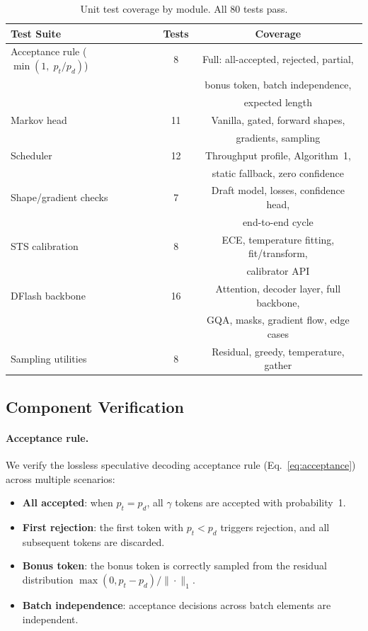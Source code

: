 \documentclass[11pt,a4paper]{article}
\begin{document}
\begin{table}[t]
\centering
\caption{Unit test coverage by module. All 80 tests pass.}
\label{tab:tests}
\begin{tabular}{lcc}
\toprule
Test Suite & Tests & Coverage \\
\midrule
Acceptance rule ($\min(1,\; p_t/p_d)$) & 8 & Full: all-accepted, rejected, partial,\\
 & & bonus token, batch independence, \\
 & & expected length \\
Markov head & 11 & Vanilla, gated, forward shapes,\\
 & & gradients, sampling \\
Scheduler & 12 & Throughput profile, Algorithm~1,\\
 & & static fallback, zero confidence \\
Shape/gradient checks & 7 & Draft model, losses, confidence head,\\
 & & end-to-end cycle \\
STS calibration & 8 & ECE, temperature fitting, fit/transform,\\
 & & calibrator API \\
DFlash backbone & 16 & Attention, decoder layer, full backbone,\\
 & & GQA, masks, gradient flow, edge cases \\
Sampling utilities & 8 & Residual, greedy, temperature, gather \\
\bottomrule
\end{tabular}
\end{table}

\subsection{Component Verification}
\label{subsec:component-verification}

\paragraph{Acceptance rule.}
We verify the lossless speculative decoding acceptance rule
(Eq.~\ref{eq:acceptance}) across multiple scenarios:
\begin{itemize}
  \item \textbf{All accepted}: when $p_t = p_d$, all $\gamma$ tokens are
    accepted with probability~1.
  \item \textbf{First rejection}: the first token with $p_t < p_d$ triggers
    rejection, and all subsequent tokens are discarded.
  \item \textbf{Bonus token}: the bonus token is correctly sampled from the
    residual distribution $\max(0, p_t - p_d) / \| \cdot \|_1$.
  \item \textbf{Batch independence}: acceptance decisions across batch
    elements are independent.
\end{itemize}
\end{document}
